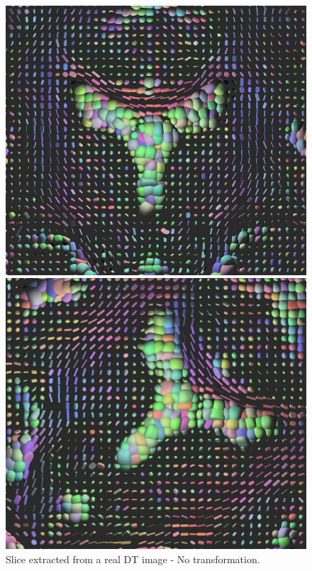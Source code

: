 \documentclass{InsightArticle}
\begin{document}
\label{sec:resultsOnRealImages}
\begin{figure}[ht]
\begin{minipage}[b]{0.5\linewidth}
\centering
\includegraphics[width=.95\textwidth]{OriginalSlice.jpg}
\caption[Tensor Transformation]{Slice extracted from a real DT image - No transformation.\\}
\label{fig:figure1}
\end{minipage}
\hspace{0.5cm}
\begin{minipage}[b]{0.5\linewidth}
\centering
\includegraphics[width=.95\textwidth]{rotation45-zoomed-bs4-cropped.jpg}

\end{minipage}
\end{figure}
\end{document}
